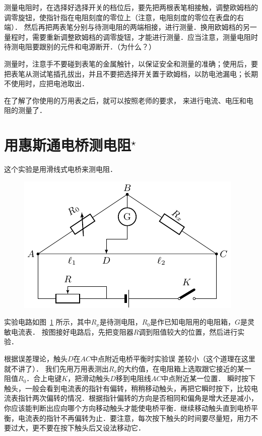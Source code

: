 测量电阻时，在选择好选择开关的档位后，要先把两根表笔相接触，调整欧姆档的调零旋钮，使指针指在电阻刻度的零位上（注意，电阻刻度的零位在表盘的右端）．
然后再把两表笔分别与待测电阻的两端相接，进行测量．换用欧姆档的另一量程时，需要重新调整欧姆档的调零旋钮，才能进行测量．应当注意，测量电阻时待测电阻要跟别的元件和电源断开．（为什么？）

测量时，注意手不要碰到表笔的金属触针，以保证安全和测量的准确；使用后，要把表笔从测试笔插孔拔出，并且不要把选择开关置于欧姆档，以防电池漏电；长期不使用时，应把电池取出．

在了解了你使用的万用表之后，就可以按照老师的要求，
来进行电流、电压和电阻的测量了．

\section{用惠斯通电桥测电阻$^\star$}

这个实验是用滑线式电桥来测电阻．
\begin{figure}[htbp]
    \centering
    \includegraphics{fig/B/9-11.pdf}
    \caption{}\label{fig_B_9-11}
\end{figure}

实验电路如图~\ref{fig_B_9-11} 所示，其中$R_x$是待测电阻，$R_0$是作已知电阻用的电阻箱，$G$是灵敏电流表．
按图接好电路后，先把变阻器$R$调到阻值较大的位置，然后进行实验．

根据误差理论，触头$D$在$AC$中点附近电桥平衡时实验误
差较小（这个道理在这里就不讲了）．
我们先用万用表测出$R_x$的大约值，在电阻箱上选取跟它接近的某一阻值$R_0$．合上电键$K$，把滑动触头$D$移到电阻线$AC$中点附近某一位置．
瞬时按下触头，一般会看到电流表的指针有偏转，稍稍移动触头，再把它瞬时按下，比较电流表指针两次偏转的情况．根据指针偏转的方向是否相同和偏角是增大还是减小，你应该能判断出应向哪个方向移动触头才能使电桥平衡．继续移动触头直到电桥平衡，电流表的指针不再偏转为止．要注意，每次按下触头的时间要尽量短，用力不要过大，更不要在按下触头后又设法移动它．


